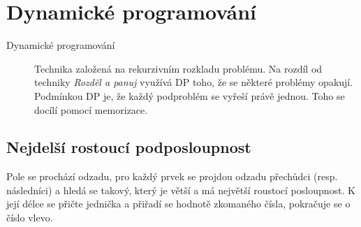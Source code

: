 \section{Dynamické programování}
  \begin{description}
    \item[Dynamické programování] Technika založená na rekurzivním rozkladu problému. Na rozdíl od techniky \emph{Rozděl a panuj}
    využívá DP toho, že se některé problémy opakují. Podmínkou DP je, že každý podproblém se vyřeší právě jednou. Toho se docílí pomocí memorizace.
  \end{description}

  \subsection{Nejdelší rostoucí podposloupnost}
    Pole se prochází odzadu, pro každý prvek se projdou odzadu přechůdci (resp. následníci) a hledá se takový,
    který je větší a má největší roustocí posloupnost.
    K její délce se přičte jednička a přiřadí se hodnotě zkomaného čísla, pokračuje se o číslo vlevo.
